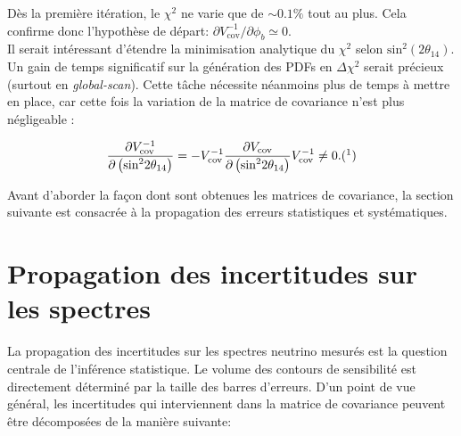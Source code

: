\bigbreak

Dès la première itération, le $\chi^2$ ne varie que de $\sim 0.1 \%$ tout au plus. Cela confirme donc l'hypothèse de départ: $\partial V^{-1}_\textrm{cov}/\partial \phi_b \simeq 0$.\\

Il serait intéressant d'étendre la minimisation analytique du $\chi^2$ selon $\textrm{sin}^2(2\theta_{14})$. Un gain de temps significatif sur la génération des PDFs en $\Delta\chi^2$ serait précieux (surtout en \textit{global-scan}). Cette tâche nécessite néanmoins plus de temps à mettre en place, car cette fois la variation de la matrice de covariance n'est plus négligeable :

\begin{equation}
    \frac{\partial V^{-1}_\textrm{cov} }{\partial \left(\textrm{sin}^2{2\theta_{14}}\right)} = - V^{-1}_\textrm{cov} \frac{\partial V_\textrm{cov}}{\partial \left(\textrm{sin}^2{2\theta_{14}}\right) } V^{-1}_\textrm{cov} \neq 0. (\footnotemark)
\end{equation}

\bigbreak

Avant d'aborder la façon dont sont obtenues les matrices de covariance, la section suivante est consacrée à la propagation des erreurs statistiques et systématiques.

\bigbreak

\section{Propagation des incertitudes sur les spectres}
\label{sec:uncertainties_propagation}

La propagation des incertitudes sur les spectres neutrino mesurés est la question centrale de l'inférence statistique. Le volume des contours de sensibilité est directement déterminé par la taille des barres d'erreurs. D'un point de vue général, les incertitudes qui interviennent dans la matrice de covariance peuvent être décomposées de la manière suivante:\\

